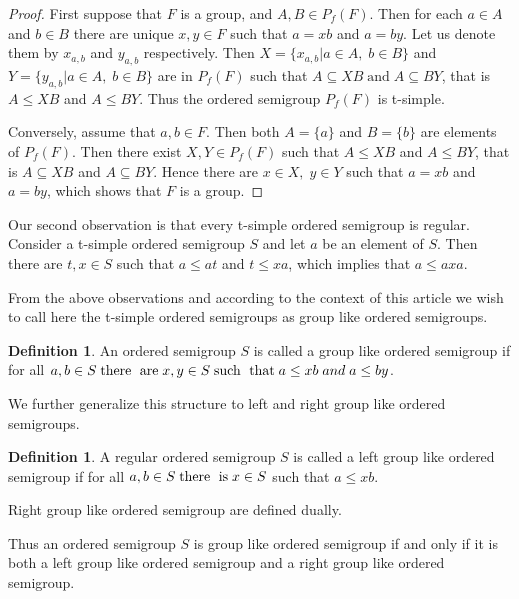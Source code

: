 \documentclass[13pt]{article}
\theoremstyle{definition}
\newtheorem{Definition}[theorem]{Definition}
\theoremstyle{remark}
\numberwithin{equation}{section}
\begin{document}
\begin{proof}
First suppose that  $F$ is a group, and  $A, B \in P_f(F)$. Then for
each $a \in A$ and $b \in B$ there are unique $x, y \in F$ such that
$a= xb$ and $a= by$. Let us denote them by $x_{a,b}$ and $y_{a,b}$
respectively. Then $X= \{ x_{a,b} | a \in A, \;b \in B\} $ and $Y=
\{y_{a,b} | a \in A, \;b \in B\} $ are in $P_f(F)$ such that $A
\subseteq XB \;\textrm{and}  \;A \subseteq BY $, that is $A \leq XB$
and $A \leq BY $. Thus the ordered semigroup $P_f(F)$ is t-simple.

Conversely, assume  that $a, b \in F$. Then both $A= \{a\}$ and $B=
\{b\}$ are elements of $P_f(F)$. Then  there exist $X, Y \in P_f(F)$
such that $A \leq XB$ and $A \leq BY$, that is $A\subseteq XB$ and
$A \subseteq BY $. Hence there are $x \in X, \;y \in Y$ such that
$a= xb$ and $ a= by $, which shows that $F$ is a group.
\end{proof}

Our second observation is that every t-simple ordered semigroup is
regular. Consider a t-simple ordered  semigroup $S$ and let $a$ be
an element of  $S$. Then there are $t, x \in S$ such that $a\leq at$
and $t \leq xa $, which implies that $a \leq axa$.

From the  above observations and according to the context of this
article we wish to call here the t-simple ordered semigroups as
group like ordered semigroups.
\begin{Definition}
An ordered semigroup $S$ is called a group like ordered semigroup
 if for all $a, b \in S \;\textrm{there \;are} \;x, y \in S
\;\textrm{such \;that} \;a \leq xb \;and \;a \leq by$.
\end{Definition}
We further generalize  this structure to left and right group like
ordered semigroups.
\begin{Definition}
A  regular ordered semigroup $S$ is called a left group like ordered
semigroup if for all $a, b \in S \;\textrm{there \;is} \;x \in S$
such that $a \leq xb $.

Right group like ordered semigroup are defined  dually.
\end{Definition}
Thus  an ordered semigroup $S$ is   group like  ordered semigroup if
and only if it is both a left  group like ordered semigroup and a
right group like ordered semigroup.
\end{document}
